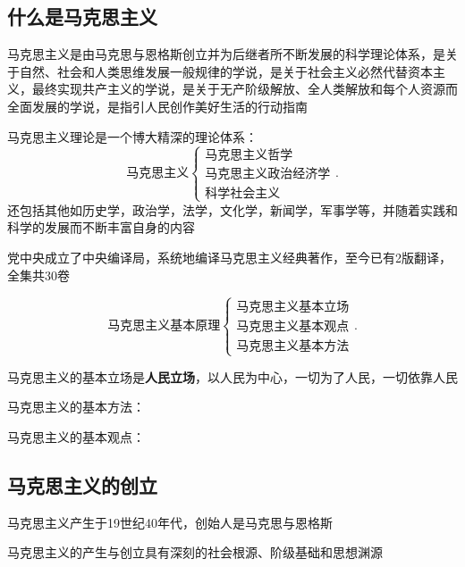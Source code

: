 \subsection{什么是马克思主义}%
\label{sub:什么是马克思主义}
\begin{notation}
    马克思主义是由马克思与恩格斯创立并为后继者所不断发展的科学理论体系，是关于自然、社会和人类思维发展一般规律的学说，是关于社会主义必然代替资本主义，最终实现共产主义的学说，是关于无产阶级解放、全人类解放和每个人资源而全面发展的学说，是指引人民创作美好生活的行动指南
\end{notation}
马克思主义理论是一个博大精深的理论体系：
\[
    \mbox{马克思主义}
    \begin{cases}
        \mbox{马克思主义哲学}\\ 
        \mbox{马克思主义政治经济学}\\ 
        \mbox{科学社会主义}
    \end{cases}
.\] 
还包括其他如历史学，政治学，法学，文化学，新闻学，军事学等，并随着实践和科学的发展而不断丰富自身的内容

党中央成立了中央编译局，系统地编译马克思主义经典著作，至今已有2版翻译，全集共30卷

\[
    \mbox{马克思主义基本原理}
    \begin{cases}
        \mbox{马克思主义基本立场}\\ 
        \mbox{马克思主义基本观点}\\ 
        \mbox{马克思主义基本方法}
    \end{cases}
.\] 
\begin{notation}
    马克思主义的基本立场是\textbf{人民立场}，以人民为中心，一切为了人民，一切依靠人民
\end{notation}
\begin{notation}
    马克思主义的基本方法：
\end{notation}
\begin{notation}
    马克思主义的基本观点：
\end{notation}

\subsection{马克思主义的创立}%
\label{sub:马克思主义的创立}
马克思主义产生于19世纪40年代，创始人是马克思与恩格斯

马克思主义的产生与创立具有深刻的社会根源、阶级基础和思想渊源

